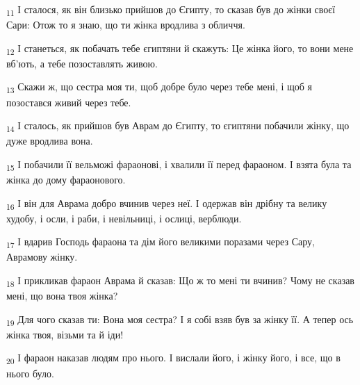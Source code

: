 \begin{tcolorbox}
\textsubscript{11} І сталося, як він близько прийшов до Єгипту, то сказав був до жінки своєї Сари: Отож то я знаю, що ти жінка вродлива з обличчя.
\end{tcolorbox}
\begin{tcolorbox}
\textsubscript{12} І станеться, як побачать тебе єгиптяни й скажуть: Це жінка його, то вони мене вб'ють, а тебе позоставлять живою.
\end{tcolorbox}
\begin{tcolorbox}
\textsubscript{13} Скажи ж, що сестра моя ти, щоб добре було через тебе мені, і щоб я позостався живий через тебе.
\end{tcolorbox}
\begin{tcolorbox}
\textsubscript{14} І сталось, як прийшов був Аврам до Єгипту, то єгиптяни побачили жінку, що дуже вродлива вона.
\end{tcolorbox}
\begin{tcolorbox}
\textsubscript{15} І побачили її вельможі фараонові, і хвалили її перед фараоном. І взята була та жінка до дому фараонового.
\end{tcolorbox}
\begin{tcolorbox}
\textsubscript{16} І він для Аврама добро вчинив через неї. І одержав він дрібну та велику худобу, і осли, і раби, і невільниці, і ослиці, верблюди.
\end{tcolorbox}
\begin{tcolorbox}
\textsubscript{17} І вдарив Господь фараона та дім його великими поразами через Сару, Аврамову жінку.
\end{tcolorbox}
\begin{tcolorbox}
\textsubscript{18} І прикликав фараон Аврама й сказав: Що ж то мені ти вчинив? Чому не сказав мені, що вона твоя жінка?
\end{tcolorbox}
\begin{tcolorbox}
\textsubscript{19} Для чого сказав ти: Вона моя сестра? І я собі взяв був за жінку її. А тепер ось жінка твоя, візьми та й іди!
\end{tcolorbox}
\begin{tcolorbox}
\textsubscript{20} І фараон наказав людям про нього. І вислали його, і жінку його, і все, що в нього було.
\end{tcolorbox}
